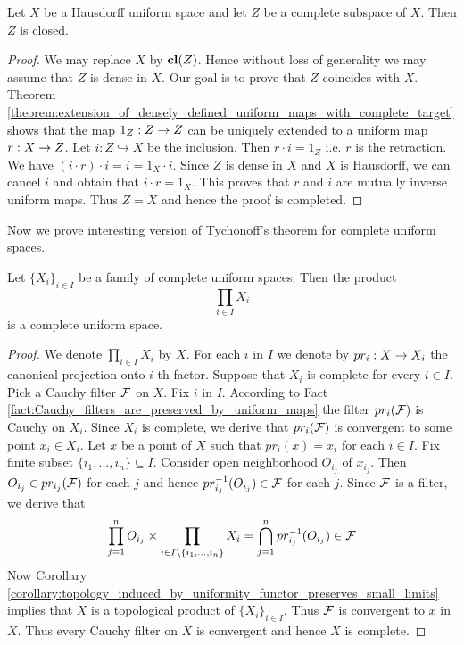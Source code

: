 \documentclass[10pt]{amsart}
\begin{document}
\begin{theorem}\label{theorem:complete_in_Hausdorff_is_closed}
	Let $X$ be a Hausdorff uniform space and let $Z$ be a complete subspace of $X$. Then $Z$ is closed.
\end{theorem}
\begin{proof}
	We may replace $X$ by $\mathbf{cl}(Z)$. Hence without loss of generality we may assume that $Z$ is dense in $X$. Our goal is to prove that $Z$ coincides with $X$. Theorem \ref{theorem:extension_of_densely_defined_uniform_maps_with_complete_target} shows that the map $1_Z:Z\rightarrow Z$ can be uniquely extended to a uniform map $r:X \rightarrow Z$. Let $i:Z \hookrightarrow X$ be the inclusion. Then $r\cdot i = 1_Z$ i.e. $r$ is the retraction. We have $\left(i\cdot r\right)\cdot i = i = 1_X\cdot i$. Since $Z$ is dense in $X$ and $X$ is Hausdorff, we can cancel $i$ and obtain that $i\cdot r = 1_X$. This proves that $r$ and $i$ are mutually inverse uniform maps. Thus $Z = X$ and hence the proof is completed.
\end{proof}
\noindent
Now we prove interesting version of Tychonoff's theorem for complete uniform spaces.

\begin{theorem}\label{theorem:product_of_complete_spaces_is_complete}
	Let $\{X_i\}_{i \in I}$ be a family of complete uniform spaces. Then the product
	$$\prod_{i \in I}X_i$$
	is a complete uniform space.
\end{theorem}
\begin{proof}
	We denote $\prod_{i \in I}X_i$ by $X$. For each $i$ in $I$ we denote by $pr_i:X\rightarrow X_i$ the canonical projection onto $i$-th factor. Suppose that $X_i$ is complete for every $i \in I$. Pick a Cauchy filter ${\mathcal F}$ on $X$. Fix $i$ in $I$. According to Fact \ref{fact:Cauchy_filters_are_preserved_by_uniform_maps} the filter $pr_i({\mathcal F})$ is Cauchy on $X_i$. Since $X_i$ is complete, we derive that $pr_i({\mathcal F})$ is convergent to some point $x_i \in X_i$. Let $x$ be a point of $X$ such that $pr_i(x) = x_i$ for each $i \in I$. Fix finite subset $\{i_1,...,i_n\}\subseteq I$. Consider open neighborhood $O_{i_j}$ of $x_{i_j}$. Then $O_{i_j}\in pr_{i_j}({\mathcal F})$ for each $j$ and hence $pr_{i_j}^{-1}(O_{i_j}) \in {\mathcal F}$ for each $j$. Since ${\mathcal F}$ is a filter, we derive that
	$$\prod_{j=1}^nO_{i_j}\times \prod_{i\in I \setminus \{i_1,...,i_n\}}X_i = \bigcap_{j=1}^n pr^{-1}_{i_j}(O_{i_j}) \in {\mathcal F}$$
	Now Corollary \ref{corollary:topology_induced_by_uniformity_functor_preserves_small_limits} implies that $X$ is a topological product of $\{X_i\}_{i\in I}$. Thus ${\mathcal F}$ is convergent to $x$ in $X$. Thus every Cauchy filter on $X$ is convergent and hence $X$ is complete.
\end{proof}
\end{document}
